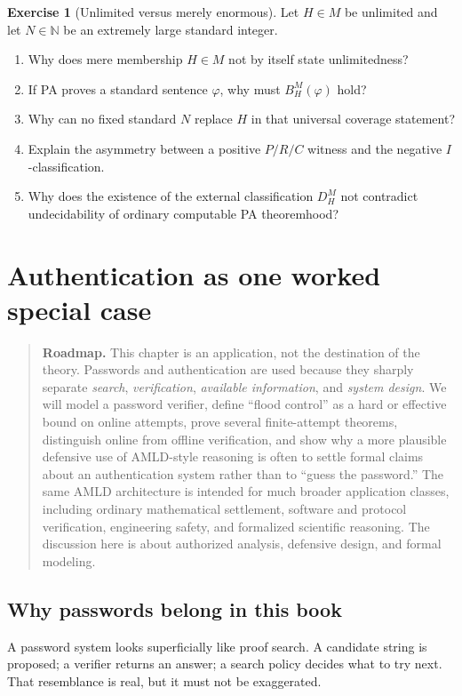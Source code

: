 \documentclass[11pt,openany]{book}
\theoremstyle{definition}
\newtheorem{exercise}[theorem]{Exercise}
\theoremstyle{remark}
\newenvironment{roadmap}{\begin{quote}\small\color{deepblue}\textbf{Roadmap.} }{\end{quote}}
\newcommand{\N}{\mathbb{N}}
\begin{document}
\begin{exercise}[Unlimited versus merely enormous]\label{ex:hyperbudget}
Let \(H\in M\) be unlimited and let \(N\in\N\) be an extremely large standard integer.
\begin{enumerate}[label=(\alph*)]
\item Why does mere membership \(H\in M\) not by itself state unlimitedness?
\item If PA proves a standard sentence \(\varphi\), why must \(B_H^M(\varphi)\) hold?
\item Why can no fixed standard \(N\) replace \(H\) in that universal coverage statement?
\item Explain the asymmetry between a positive \(P/R/C\) witness and the negative \(I\)-classification.
\item Why does the existence of the external classification \(D_H^M\) not contradict undecidability of ordinary computable PA theoremhood?
\end{enumerate}
\end{exercise}


\chapter{Authentication as one worked special case}
\begin{roadmap}
This chapter is an application, not the destination of the theory. Passwords and authentication are used because they sharply separate \emph{search}, \emph{verification}, \emph{available information}, and \emph{system design}. We will model a password verifier, define ``flood control'' as a hard or effective bound on online attempts, prove several finite-attempt theorems, distinguish online from offline verification, and show why a more plausible defensive use of AMLD-style reasoning is often to settle formal claims about an authentication system rather than to ``guess the password.'' The same AMLD architecture is intended for much broader application classes, including ordinary mathematical settlement, software and protocol verification, engineering safety, and formalized scientific reasoning. The discussion here is about authorized analysis, defensive design, and formal modeling.
\end{roadmap}

\section{Why passwords belong in this book}
A password system looks superficially like proof search. A candidate string is proposed; a verifier returns an answer; a search policy decides what to try next. That resemblance is real, but it must not be exaggerated.
\end{document}
